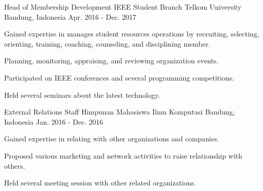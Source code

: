 \begin{cventries}

  \cventry
    {Head of Membership Development} %
    {IEEE Student Branch Telkom University} %
    {Bandung, Indonesia} %
    {Apr. 2016 - Dec. 2017} %
    {
      \begin{cvitems} %
        \item {Gained expertise in manages student resources operations by recruiting, selecting, orienting, training, coaching, counseling, and disciplining member.}
        \item {Planning, monitoring, appraising, and reviewing organization events.}
        \item {Participated on IEEE conferences and several programming competitions.}
        \item {Held several seminars about the latest technology.}
      \end{cvitems}
    }

  \cventry
    {External Relations Staff} %
    {Himpunan Mahasiswa Ilmu Komputasi} %
    {Bandung, Indonesia} %
    {Jan. 2016 - Dec. 2016} %
    {
      \begin{cvitems} %
        \item {Gained expertise in relating with other organizations and companies.}
        \item {Proposed various marketing and network activities to raise relationship with others.}
        \item {Held several meeting session with other related organizations.}
      \end{cvitems}
    }

\end{cventries}
